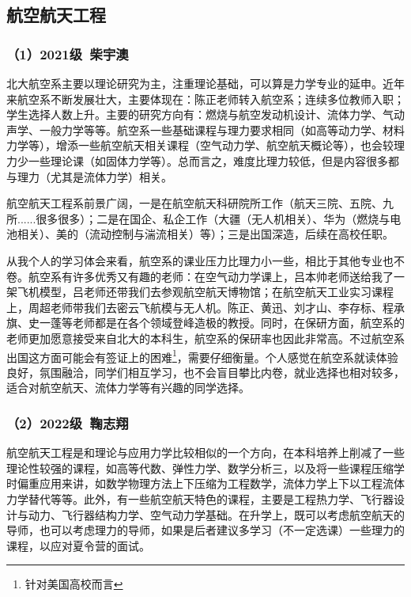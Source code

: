 \documentclass[11pt,oneside]{book}
\begin{document}
\subsection{航空航天工程}
\subsubsection{（1）2021级\ 柴宇澳}

北大航空系主要以理论研究为主，注重理论基础，可以算是力学专业的延申。近年来航空系不断发展壮大，主要体现在：陈正老师转入航空系；连续多位教师入职；学生选择人数上升。主要的研究方向有：燃烧与航空发动机设计、流体力学、气动声学、一般力学等等。航空系一些基础课程与理力要求相同（如高等动力学、材料力学等），增添一些航空航天相关课程（空气动力学、航空航天概论等），也会较理力少一些理论课（如固体力学等）。总而言之，难度比理力较低，但是内容很多都与理力（尤其是流体力学）相关。

\vspace{10pt}

航空航天工程系前景广阔，一是在航空航天科研院所工作（航天三院、五院、九所......很多很多）；二是在国企、私企工作（大疆（无人机相关）、华为（燃烧与电池相关）、美的（流动控制与湍流相关）等）；三是出国深造，后续在高校任职。

\vspace{10pt}

从我个人的学习体会来看，航空系的课业压力比理力小一些，相比于其他专业也不卷。航空系有许多优秀又有趣的老师：在空气动力学课上，吕本帅老师送给我了一架飞机模型，吕老师还带我们去参观航空航天博物馆；在航空航天工业实习课程上，周超老师带我们去密云飞航模与无人机。陈正、黄迅、刘才山、李存标、程承旗、史一蓬等老师都是在各个领域登峰造极的教授。同时，在保研方面，航空系的老师更加愿意接受来自北大的本科生，航空系的保研率也因此非常高。不过航空系出国这方面可能会有签证上的困难\footnote{针对美国高校而言}，需要仔细衡量。个人感觉在航空系就读体验良好，氛围融洽，同学们相互学习，也不会盲目攀比内卷，就业选择也相对较多，适合对航空航天、流体力学等有兴趣的同学选择。

\subsubsection{（2）2022级\ 鞠志翔}

航空航天工程是和理论与应用力学比较相似的一个方向，在本科培养上削减了一些理论性较强的课程，如高等代数、弹性力学、数学分析三，以及将一些课程压缩学时偏重应用来讲，如数学物理方法上下压缩为工程数学，流体力学上下以工程流体力学替代等等。此外，有一些航空航天特色的课程，主要是工程热力学、飞行器设计与动力、飞行器结构力学、空气动力学基础。在升学上，既可以考虑航空航天的导师，也可以考虑理力的导师，如果是后者建议多学习（不一定选课）一些理力的课程，以应对夏令营的面试。
\end{document}
